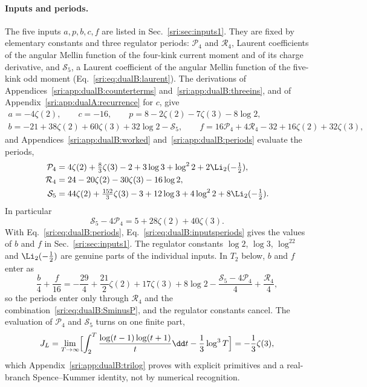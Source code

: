 \paragraph{Inputs and periods.} The five inputs $a,p,b,c,f$ are listed in Sec.~\ref{sri:sec:inputs1}. They are fixed by
elementary constants and three regulator periods: $\mathcal P_4$ and $\mathcal R_4$, Laurent coefficients of the
angular Mellin function of the four-kink current moment and of its charge derivative, and $\mathcal S_5$, a Laurent
coefficient of the angular Mellin function of the five-kink odd moment (Eq.~\eqref{sri:eq:dualB:laurent}). The
derivations of Appendices~\ref{sri:app:dualB:counterterms} and~\ref{sri:app:dualB:threeins}, and of
Appendix~\ref{sri:app:dualA:recurrence} for $c$, give
\begin{equation}
\begin{gathered}
 a=-4\zeta(2),\qquad c=-16,\qquad p=8-2\zeta(2)-7\zeta(3)-8\log2,\\
 b=-21+38\zeta(2)+60\zeta(3)+32\log2-\mathcal S_5,\qquad
 f=16\mathcal P_4+4\mathcal R_4-32+16\zeta(2)+32\zeta(3),
\end{gathered}
\label{sri:eq:dualB:inputsperiods}
\end{equation}
and Appendices~\ref{sri:app:dualB:worked} and~\ref{sri:app:dualB:periods} evaluate the periods,
\begin{equation}
\begin{aligned}
 \mathcal P_4&=4\zeta(2)+\tfrac83\zeta(3)-2+3\log3+\log^22+2\Li_2(-\tfrac12),\\
 \mathcal R_4&=24-20\zeta(2)-30\zeta(3)-16\log2,\\
 \mathcal S_5&=44\zeta(2)+\tfrac{152}{3}\zeta(3)-3+12\log3+4\log^22+8\Li_2(-\tfrac12).
\end{aligned}
\label{sri:eq:dualB:periods}
\end{equation}
In particular
\begin{equation}
 \mathcal S_5-4\mathcal P_4=5+28\zeta(2)+40\zeta(3).
 \label{sri:eq:dualB:SminusP}
\end{equation}
With Eq.~\eqref{sri:eq:dualB:periods}, Eq.~\eqref{sri:eq:dualB:inputsperiods} gives the values of $b$ and $f$ in
Sec.~\ref{sri:sec:inputs1}. The regulator constants $\log2$, $\log3$, $\log^22$ and $\Li_2(-\frac12)$ are genuine parts of
the individual inputs. In $T_2$ below, $b$ and $f$ enter as
\begin{equation}
 \frac b4+\frac f{16}=-\frac{29}{4}+\frac{21}{2}\zeta(2)+17\zeta(3)+8\log2
 -\frac{\mathcal S_5-4\mathcal P_4}{4}+\frac{\mathcal R_4}{4},
\end{equation}
so the periods enter only through $\mathcal R_4$ and the combination~\eqref{sri:eq:dualB:SminusP}, and the regulator
constants cancel. The evaluation of $\mathcal P_4$ and $\mathcal S_5$ turns on one finite part,
\begin{equation}
 J_L=\lim_{T\to\infty}\Bigl[\int_2^T\frac{\log(t-1)\log(t+1)}{t}\dd t-\frac13\log^3T\Bigr]=-\frac13\zeta(3),
 \label{sri:eq:dualB:JLshort}
\end{equation}
which Appendix~\ref{sri:app:dualB:trilog} proves with explicit primitives and a real-branch Spence--Kummer identity, not
by numerical recognition.

